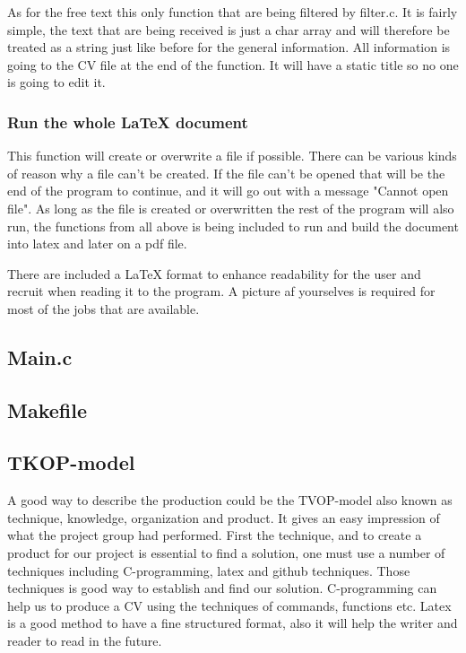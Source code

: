 As for the free text this only function that are being filtered by filter.c. It is fairly simple, 
the text that are being received is just a char array and will therefore be treated as a string 
just like before for the general information. All information is going to the CV file at the end of the function.
It will have a static title so no one is going to edit it.

\subsubsection{Run the whole LaTeX document}
This function will create or overwrite a file if possible. There can be various kinds of reason why a file can't be created.
If the file can't be opened that will be the end of the program to continue, 
and it will go out with a message "Cannot open file".
As long as the file is created or overwritten the rest of the program will also run, 
the functions from all above is being included to run and build the document into latex and later on a pdf file.

There are included a LaTeX format to enhance readability for the user and recruit when reading it
to the program. A picture af yourselves is required for most of the jobs that are available.

\subsection{Main.c}
\subsection{Makefile}

\subsection{TKOP-model}
A good way to describe the production could be the TVOP-model also known as technique, knowledge, organization and product.
It gives an easy impression of what the project group had performed.
First the technique, and to create a product for our project is essential to find a solution, 
one must use a number of techniques including C-programming, latex and github techniques.
Those techniques is good way to establish and find our solution. C-programming can help us to produce a CV using the techniques
of commands, functions etc. Latex is a good method to have a fine structured format, 
also it will help the writer and reader to read in the future. \\

